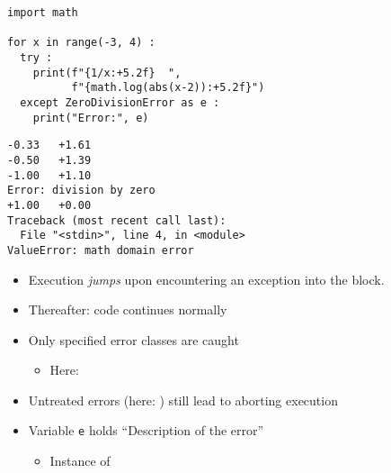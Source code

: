 \begin{frame}[fragile]
%
\begin{tcbraster}[raster columns=2,
                  raster equal height,
                  nobeforeafter,
                  raster column skip=0.2cm]
\begin{codebox}
\begin{verbatim}
import math

for x in range(-3, 4) :
  try :
    print(f"{1/x:+5.2f}  ",
          f"{math.log(abs(x-2)):+5.2f}")
  except ZeroDivisionError as e :
    print("Error:", e)
\end{verbatim}
\end{codebox}
%
\begin{cmdbox}
\begin{verbatim}
-0.33   +1.61
-0.50   +1.39
-1.00   +1.10
Error: division by zero
+1.00   +0.00
Traceback (most recent call last):
  File "<stdin>", line 4, in <module>
ValueError: math domain error
\end{verbatim}
\end{cmdbox}
\end{tcbraster}
%
\begin{center}
\begin{itemize}
\item[\Thus] Execution \emph{jumps} upon encountering an exception into the  block.
\item[\Thus] Thereafter: code continues normally
\item[\Thus] Only specified error classes are caught
	\begin{itemize}
	\item[\thus] Here: 
	\end{itemize}
\item[\Thus] Untreated errors (here: ) still lead to aborting execution
\item[\Thus] Variable \texttt{e} holds \enquote{Description of the error}
	\begin{itemize}
	\item[\thus] Instance of 
	\end{itemize}
\end{itemize}
\end{center}
%
\end{frame}


